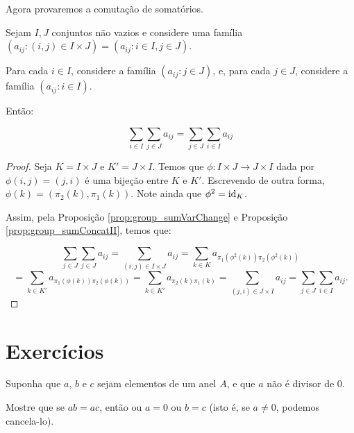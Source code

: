 Agora provaremos a comutação de somatórios.

\begin{prop}\label{prop:group_sumCommut}
    Sejam $I, J$ conjuntos não vazios e considere uma família $(a_{ij}:(i, j)\in I\times J)=(a_{ij}:i \in I, j \in J)$.

    Para cada $i \in I$, considere a família $(a_{ij}: j \in J)$, e, para cada $j \in J$, considere a família $(a_{ij}: i \in I)$.

    Então:

    \[\sum_{i\in I}\sum_{j \in J}a_{ij}=\sum_{j \in J}\sum_{i \in I}a_{ij}\]
\end{prop}
\begin{proof}
    Seja $K=I\times J$ e $K'=J\times I$.
    Temos que $\phi:I\times J\rightarrow J\times I$ dada por $\phi(i, j)=(j, i)$ é uma bijeção entre $K$ e $K'$. Escrevendo de outra forma, $\phi(k)=(\pi_2(k), \pi_1(k))$. Note ainda que $\phi^2=\operatorname{id}_K$.

    Assim, pela Proposição \ref{prop:group_sumVarChange} e Proposição \ref{prop:group_sumConcatII}, temos que:

    \[\sum_{j\in J}\sum_{j \in J}a_{ij}=\sum_{(i,j)\in I\times J}a_{ij}=\sum_{k\in K}a_{\pi_1(\phi^2(k))\pi_2(\phi^2(k))}\]
    \[=\sum_{k \in K'}a_{\pi_1(\phi(k))\pi_2(\phi(k))}=\sum_{k \in K'}a_{\pi_2(k)\pi_1(k)}=\sum_{(j, i)\in J\times I}a_{ij}=\sum_{j \in J}\sum_{i \in I}a_{ij}.\]

\end{proof}
\section{Exercícios}
\begin{exer}
    Suponha que $a$, $b$ e $c$ sejam elementos de um anel $A$, e que $a$ não é divisor de $0$.
    
    Mostre que se $ab = ac$, então ou $a = 0$ ou $b = c$ (isto é, se $a\neq 0$, podemos cancela-lo).
\end{exer}